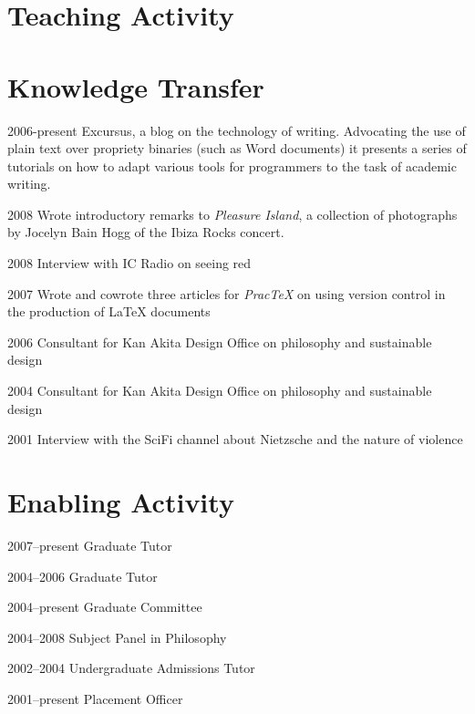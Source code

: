 \documentclass[contbibnum]{cv}
\begin{document}


\section{Teaching Activity}\label{sec:teaching_activity} %




\section{Knowledge Transfer}\label{sec:knowledge_transfer} %

\begin{topic}
	\item[2006-present] Excursus, a blog on the technology of writing. Advocating the use of plain text over propriety binaries (such as Word documents) it presents a series of tutorials on how to adapt various tools for programmers to the task of academic writing.
	\item[2008] Wrote introductory remarks to \emph{Pleasure Island}, a collection of photographs by Jocelyn Bain Hogg of the Ibiza Rocks concert.
	\item[2008] Interview with IC Radio on seeing red 
	\item[2007] Wrote and cowrote three articles for \emph{PracTeX} on using version control in the production of LaTeX documents
	\item[2006] Consultant for Kan Akita Design Office on philosophy and sustainable design
	\item[2004] Consultant for Kan Akita Design Office on philosophy and sustainable design
	\item[2001] Interview with the SciFi channel about Nietzsche and the nature of violence
\end{topic}


\section{Enabling Activity}\label{sec:enabling_activity} %

\begin{topic}
    \item[2007--present] Graduate Tutor
    \item[2004--2006] Graduate Tutor
    \item[2004--present] Graduate Committee
    \item[2004--2008] Subject Panel in Philosophy
    \item[2002--2004] Undergraduate Admissions Tutor
    \item[2001--present] Placement Officer
\end{topic}
\end{document}
